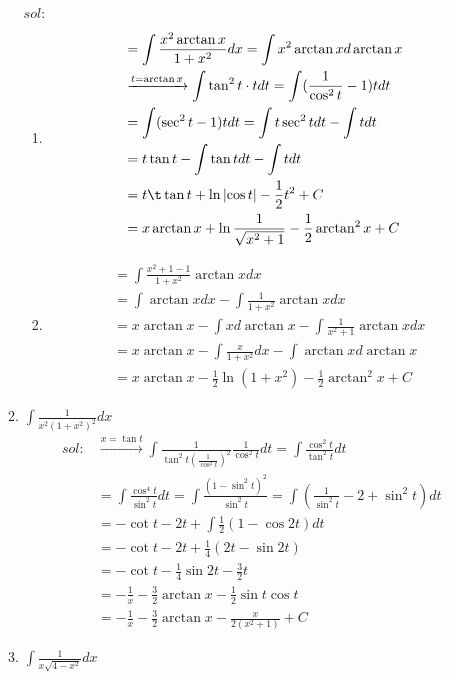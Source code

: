 \begin{enumerate}[{例}1.]
\begin{enumerate}[(1)]
                    $sol:$
                    \begin{enumerate}[$1^\circ$]
                        \item
                            \begin{align*}
                                &=\int\frac{x^2\arctan x}{1+x^2}dx=\int x^2\arctan xd\arctan x\\
                                &\xrightarrow{t=\arctan x}\int\tan^2 t\cdot tdt=\int(\frac{1}{\cos^2 t}-1)tdt\\
                                &=\int(\sec^2 t-1)tdt=\int t\sec^2 tdt-\int tdt\\
                                &=t\tan t-\int\tan tdt-\int tdt\\
                                &=t\t\tan t+\ln\left|\cos t\right|-\frac{1}{2}t^2+C\\
                                &=x\arctan x+\ln\frac{1}{\sqrt{x^2+1}}-\frac{1}{2}\arctan^2 x+C
                            \end{align*}
                        \item
                            \begin{align*}
                                &=\int\frac{x^2+1-1}{1+x^2}\arctan xdx\\
                                &=\int\arctan xdx-\int\frac{1}{1+x^2}\arctan xdx\\
                                &=x\arctan x-\int xd\arctan x-\int\frac{1}{x^2+1}\arctan xdx\\
                                &=x\arctan x-\int\frac{x}{1+x^2}dx-\int\arctan xd\arctan x\\
                                &=x\arctan x-\frac{1}{2}\ln(1+x^2)-\frac{1}{2}\arctan^2 x+C
                            \end{align*}
                    \end{enumerate}
                \item $\int \frac{1}{x^2(1+x^2)^2}dx$
                    \begin{align*}
                        sol:&\xrightarrow{x=\tan t}\int\frac{1}{\tan^2 t(\frac{1}{\cos^2 t})^2}\frac{1}{\cos^2 t}dt=\int\frac{\cos^2 t}{\tan^2 t}dt\\
                            &=\int\frac{\cos^4 t}{\sin^2 t}dt=\int\frac{(1-\sin^2 t)^2}{\sin^2 t}=\int(\frac{1}{\sin^2 t}-2+\sin^2 t)dt\\
                            &=-\cot t-2t+\int\frac{1}{2}(1-\cos 2t)dt\\
                            &=-\cot t-2t+\frac{1}{4}(2t-\sin 2t)\\
                            &=-\cot t-\frac{1}{4}\sin 2t-\frac{3}{2}t\\
                            &=-\frac{1}{x}-\frac{3}{2}\arctan x-\frac{1}{2}\sin t\cos t\\
                            &=-\frac{1}{x}-\frac{3}{2}\arctan x-\frac{x}{2(x^2+1)}+C
                    \end{align*}
                \item $\int \frac{1}{x\sqrt{4-x^2}}dx$


\end{enumerate}
\end{enumerate}
